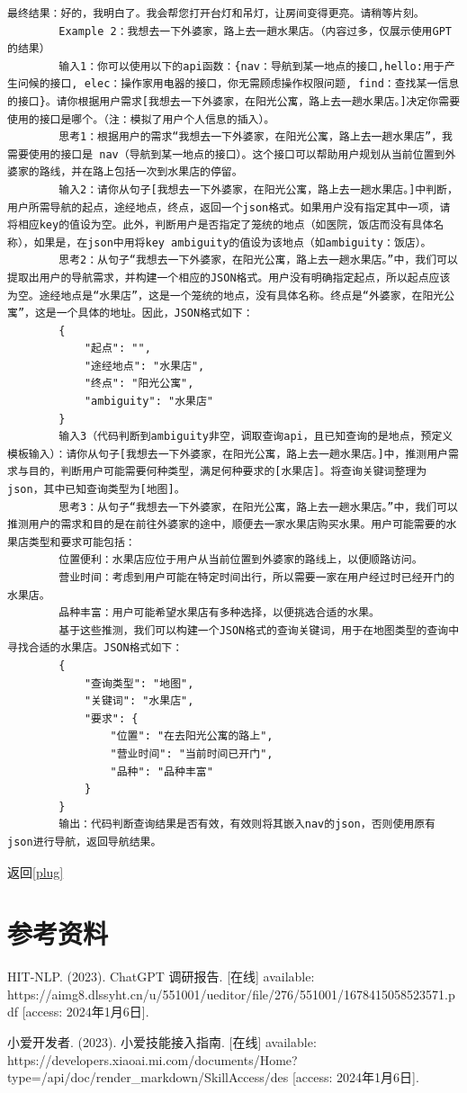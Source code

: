 \documentclass{article}
\begin{document}
\begin{lstlisting}[style=json]
			最终结果：好的，我明白了。我会帮您打开台灯和吊灯，让房间变得更亮。请稍等片刻。
		Example 2：我想去一下外婆家，路上去一趟水果店。（内容过多，仅展示使用GPT的结果）
		输入1：你可以使用以下的api函数：{nav：导航到某一地点的接口,hello:用于产生问候的接口, elec：操作家用电器的接口，你无需顾虑操作权限问题, find：查找某一信息的接口}。请你根据用户需求[我想去一下外婆家，在阳光公寓，路上去一趟水果店。]决定你需要使用的接口是哪个。（注：模拟了用户个人信息的插入）。
		思考1：根据用户的需求“我想去一下外婆家，在阳光公寓，路上去一趟水果店”，我需要使用的接口是 nav（导航到某一地点的接口）。这个接口可以帮助用户规划从当前位置到外婆家的路线，并在路上包括一次到水果店的停留。
		输入2：请你从句子[我想去一下外婆家，在阳光公寓，路上去一趟水果店。]中判断，用户所需导航的起点，途经地点，终点，返回一个json格式。如果用户没有指定其中一项，请将相应key的值设为空。此外，判断用户是否指定了笼统的地点（如医院，饭店而没有具体名称），如果是，在json中用将key ambiguity的值设为该地点（如ambiguity：饭店）。
		思考2：从句子“我想去一下外婆家，在阳光公寓，路上去一趟水果店。”中，我们可以提取出用户的导航需求，并构建一个相应的JSON格式。用户没有明确指定起点，所以起点应该为空。途经地点是“水果店”，这是一个笼统的地点，没有具体名称。终点是“外婆家，在阳光公寓”，这是一个具体的地址。因此，JSON格式如下：
		{
			"起点": "",
			"途经地点": "水果店",
			"终点": "阳光公寓",
			"ambiguity": "水果店"
		}
		输入3（代码判断到ambiguity非空，调取查询api，且已知查询的是地点，预定义模板输入）：请你从句子[我想去一下外婆家，在阳光公寓，路上去一趟水果店。]中，推测用户需求与目的，判断用户可能需要何种类型，满足何种要求的[水果店]。将查询关键词整理为json，其中已知查询类型为[地图]。
		思考3：从句子“我想去一下外婆家，在阳光公寓，路上去一趟水果店。”中，我们可以推测用户的需求和目的是在前往外婆家的途中，顺便去一家水果店购买水果。用户可能需要的水果店类型和要求可能包括：
		位置便利：水果店应位于用户从当前位置到外婆家的路线上，以便顺路访问。
		营业时间：考虑到用户可能在特定时间出行，所以需要一家在用户经过时已经开门的水果店。
		品种丰富：用户可能希望水果店有多种选择，以便挑选合适的水果。
		基于这些推测，我们可以构建一个JSON格式的查询关键词，用于在地图类型的查询中寻找合适的水果店。JSON格式如下：
		{
			"查询类型": "地图",
			"关键词": "水果店",
			"要求": {
				"位置": "在去阳光公寓的路上",
				"营业时间": "当前时间已开门",
				"品种": "品种丰富"
			}
		}
		输出：代码判断查询结果是否有效，有效则将其嵌入nav的json，否则使用原有json进行导航，返回导航结果。
	\end{lstlisting}
	返回\ref{plug}
	\section*{参考资料}
	HIT-NLP. (2023). ChatGPT 调研报告. [在线] available: https://aimg8.dlssyht.cn/u/551001/ueditor/file/276/551001/1678415058523571.pdf [access: 2024年1月6日].
	
	小爱开发者. (2023). 小爱技能接入指南. [在线] available: https://developers.xiaoai.mi.com/documents/Home?type=/api/doc/render\_markdown/SkillAccess/des [access: 2024年1月6日].
	
\end{document}
